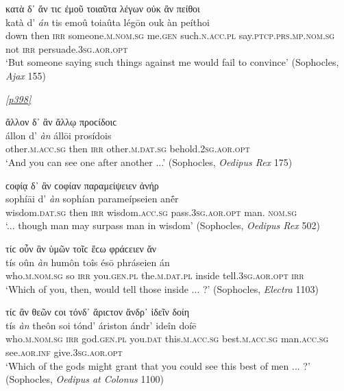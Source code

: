 \begin{exe}
\ex κατὰ δ᾽ ἄν τιϲ ἐμοῦ τοιαῦτα λέγων οὐκ ἂν πείθοι\\
\gll katà d' \emph{án} tis emoû toiaûta légōn ouk àn peíthoi\\
down then \textsc{irr} someone.\textsc{m.nom.sg} me.\textsc{gen} such.\textsc{n.acc.pl} say.\textsc{ptcp.prs.mp.nom.sg} not \textsc{irr} persuade.\textsc{3sg.aor.opt}\\
\trans `But someone saying such things against me would fail to convince' (Sophocles, \textit{Ajax} 155)
\label{wordgroup4}
\end{exe}

\hyperlink{p398}{\emph{[p398]}}

\begin{exe}
\ex ἄλλον δ᾽ ἂν ἄλλῳ προϲίδοιϲ\\
\gll állon d' \emph{àn} állōi prosídois\\
other.\textsc{m.acc.sg} then \textsc{irr} other.\textsc{m.dat.sg} behold.\textsc{2sg.aor.opt}\\
\trans `And you can see one after another ...' (Sophocles, \textit{Oedipus Rex} 175)
\label{wordgroup5}
\end{exe}

\begin{exe}
\ex ϲοφίᾳ δ᾽ ἂν ϲοφίαν παραμείψειεν ἀνήρ\\
\gll sophíāi d' \emph{àn} sophían parameípseien anḗr\\
wisdom.\textsc{dat.sg} then \textsc{irr} wisdom.\textsc{acc.sg} pass.\textsc{3sg.aor.opt} man. \textsc{nom.sg}\\
\trans `... though man may surpass man in wisdom' (Sophocles, \textit{Oedipus Rex} 502)
\label{wordgroup6}
\end{exe}

\begin{exe}
\ex τίϲ οὖν ἂν ὑμῶν τοῖϲ ἔϲω φράϲειεν ἄν\\
\gll tís oûn \emph{àn} humôn toîs ésō phráseien án\\
who.\textsc{m.nom.sg} so \textsc{irr} you.\textsc{gen.pl} the.\textsc{m.dat.pl} inside tell.\textsc{3sg.aor.opt} \textsc{irr}\\
\trans `Which of you, then, would tell those inside ... ?' (Sophocles, \textit{Electra} 1103)
\label{wordgroup7}
\end{exe}

\begin{exe}
\ex τίϲ ἂν θεῶν ϲοι τόνδ᾽ ἄριϲτον ἄνδρ᾽ ἰδεῖν δοίη\\
\gll tís \emph{àn} theôn soi tónd' áriston ándr' ideîn doíē\\
who.\textsc{m.nom.sg} \textsc{irr} god.\textsc{gen.pl} you.\textsc{dat} this.\textsc{m.acc.sg} best.\textsc{m.acc.sg} man.\textsc{acc.sg} see.\textsc{aor.inf} give.\textsc{3sg.aor.opt}\\
\trans `Which of the gods might grant that you could see this best of men ... ?' (Sophocles, \textit{Oedipus at Colonus} 1100)
\label{wordgroup8}
\end{exe}

